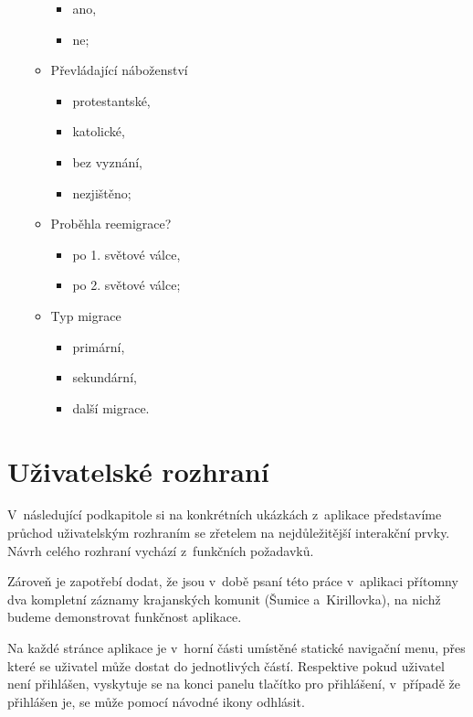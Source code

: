 \begin{itemize}
\begin{itemize}
    \begin{itemize}
    \tightlist
    \item
      ano,
    \item
      ne;
    \end{itemize}
  \item
    Převládající náboženství

    \begin{itemize}
    \tightlist
    \item
      protestantské,
    \item
      katolické,
    \item
      bez vyznání,
    \item
      nezjištěno;
    \end{itemize}
  \item
    Proběhla reemigrace?

    \begin{itemize}
    \tightlist
    \item
      po 1. světové válce,
    \item
      po 2. světové válce;
    \end{itemize}
  \item
    Typ migrace

    \begin{itemize}
    \tightlist
    \item
      primární,
    \item
      sekundární,
    \item
      další migrace.
    \end{itemize}
  \end{itemize}
\end{itemize}

\hypertarget{uux17eivatelskuxe9-rozhranuxed}{%
\section{Uživatelské rozhraní}\label{uux17eivatelskuxe9-rozhranuxed}}

V~následující podkapitole si na konkrétních ukázkách z~aplikace představíme průchod uživatelským rozhraním se zřetelem na nejdůležitější interakční prvky. Návrh celého rozhraní vychází z~funkčních požadavků.

Zároveň je zapotřebí dodat, že jsou v~době psaní této práce v~aplikaci přítomny dva kompletní záznamy krajanských komunit (Šumice a~Kirillovka), na nichž budeme demonstrovat funkčnost aplikace.

Na každé stránce aplikace je v~horní části umístěné statické navigační menu, přes které se uživatel může dostat do jednotlivých částí. Respektive pokud uživatel není přihlášen, vyskytuje se na konci panelu tlačítko pro přihlášení, v~případě že přihlášen je, se může pomocí návodné ikony odhlásit.

